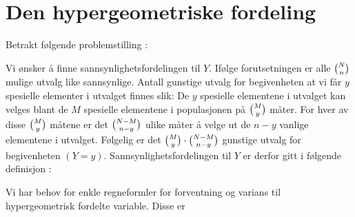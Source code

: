 \section{Den hypergeometriske fordeling}

Betrakt følgende problemstilling :
\begin{center}  \end{center}

\noindent Vi ønsker å finne sannsynlighetsfordelingen til $Y$.
Ifølge forutsetningen er alle ${{N}\choose{n}}$ mulige utvalg like
sannsynlige. Antall gunstige utvalg for begivenheten at vi får
$y$ spesielle elementer i utvalget finnes slik: De $y$ spesielle
elementene i utvalget kan velges blant de $M$ spesielle
elementene i populasjonen på ${{M}\choose{y}}$ måter. For hver av
disse ${{M}\choose{y}}$ måtene er det ${{N-M}\choose{n-y}}$ ulike måter å
velge ut de $n-y$ vanlige elementene i utvalget. Følgelig er det
${{M}\choose{y}}\cdot {{N-M}\choose{n-y}}$ gunstige utvalg for
begivenheten $(Y=y)$. Sannsynlighetsfordelingen til $Y$ er derfor
gitt i følgende definisjon :
\begin{center}  \end{center}
\noindent Vi har behov for enkle regneformler for forventning og varians
til hypergeometrisk fordelte variable. Disse er

